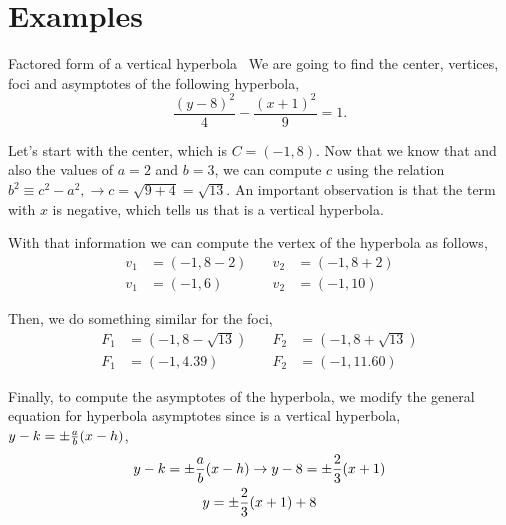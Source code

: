 \documentclass[../main-exe.tex]{subfiles}
\begin{document}
\section{Examples}

\begin{example}{Factored form of a vertical hyperbola}{~}
    We are going to find the center, vertices, foci and asymptotes of the following hyperbola, \[\frac{(y-8)^2}{4}-\frac{(x+1)^2}{9}=1.\]

    Let's start with the center, which is $C=(-1,8)$.
    Now that we know that and also the values of $a=2$ and $b=3$, we can compute $c$ using the relation $b^2\equiv c^2 -a^2,\rightarrow c = \sqrt{9 + 4} = \sqrt{13}$.
    An important observation is that the term with $x$ is negative, which tells us that is a vertical hyperbola.

    With that information we can compute the vertex of the hyperbola as follows,
    \begin{align*}
        v_1 &= (-1,8-2) &\quad v_2 &= (-1,8+2) \\
        v_1 &= (-1,6) &\quad v_2 &= (-1,10)
    \end{align*}

    Then, we do something similar for the foci,
    \begin{align*}
        F_1 &= (-1,8-\sqrt{13}) &\quad F_2 &= (-1,8+\sqrt{13}) \\
        F_1 &= (-1,4.39) &\quad F_2 &= (-1,11.60)
    \end{align*}

    Finally, to compute the asymptotes of the hyperbola, we modify the general equation for hyperbola asymptotes since is a vertical hyperbola, $y-k=\pm\frac{a}{b}\qty(x-h)$,
    \begin{gather*}
        y-k=\pm\frac{a}{b}\qty(x-h)\rightarrow y-8=\pm\frac{2}{3}\qty(x+1) \\
        y = \pm\frac{2}{3}\qty(x+1) +8
    \end{gather*}
\end{example}
\end{document}
